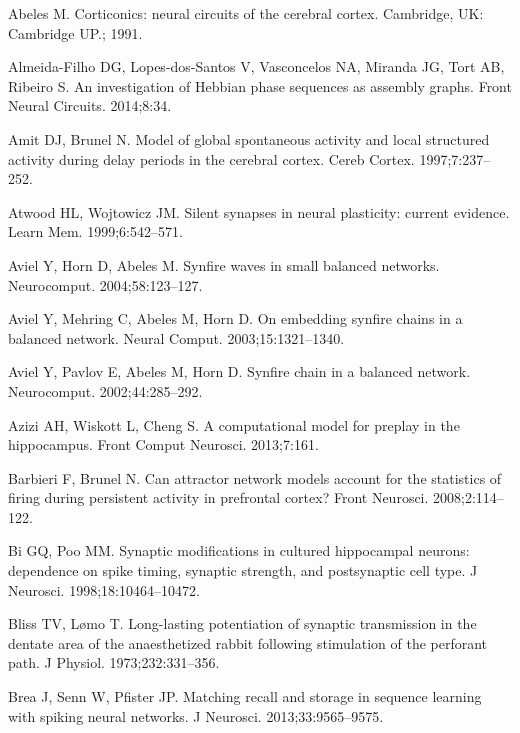 
\begin{thebibliography}{}

Abeles M.
\newblock Corticonics: neural circuits of the cerebral cortex.
\newblock Cambridge, UK: Cambridge UP.; 1991.

Almeida-Filho DG, Lopes-dos-Santos V, Vasconcelos NA, Miranda JG,
  Tort AB, Ribeiro S.
\newblock An investigation of Hebbian phase sequences as assembly graphs.
\newblock Front Neural Circuits. 2014;8:34.

Amit DJ, Brunel N.
\newblock Model of global spontaneous activity and local structured activity during delay periods in the cerebral cortex.
\newblock Cereb Cortex. 1997;7:237--252.

Atwood HL, Wojtowicz JM.
\newblock Silent synapses in neural plasticity: current evidence.
\newblock Learn Mem. 1999;6:542--571.

Aviel Y, Horn D, Abeles M.
\newblock Synfire waves in small balanced networks.
\newblock Neurocomput. 2004;58:123--127.

Aviel Y, Mehring C, Abeles M, Horn D.
\newblock On embedding synfire chains in a balanced network.
\newblock Neural Comput. 2003;15:1321--1340.

Aviel Y, Pavlov E, Abeles M, Horn D.
\newblock Synfire chain in a balanced network.
\newblock Neurocomput. 2002;44:285--292.

Azizi AH, Wiskott L, Cheng S.
\newblock A computational model for preplay in the hippocampus.
\newblock Front Comput Neurosci. 2013;7:161.

Barbieri F, Brunel N.
\newblock Can attractor network models account for the statistics of firing during persistent activity in prefrontal cortex?
\newblock Front Neurosci. 2008;2:114--122.

Bi GQ, Poo MM.
\newblock Synaptic modifications in cultured hippocampal neurons: dependence on
  spike timing, synaptic strength, and postsynaptic cell type.
\newblock J Neurosci. 1998;18:10464--10472.

Bliss TV, L{\o}mo T.
\newblock Long-lasting potentiation of synaptic transmission in the dentate
  area of the anaesthetized rabbit following stimulation of the perforant path.
\newblock J Physiol. 1973;232:331--356.

Brea J, Senn W, Pfister JP.
\newblock Matching recall and storage in sequence learning with spiking neural networks.
\newblock J Neurosci. 2013;33:9565--9575.


\end{thebibliography}
